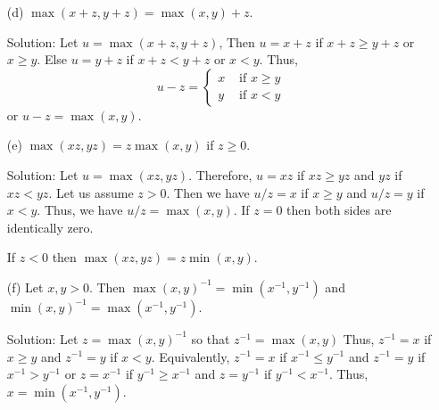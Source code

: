 \begin{enumerate}
\begin{enumerate}
\item[(d)] $\max(x + z, y + z) = \max(x, y) + z$.
\item[Solution:] Let $u = \max(x + z, y + z)$, Then $u = x + z$ if
$x + z \ge y + z$ or $x \ge y$. Else $u = y + z$ if $x + z < y + z$ or
$x < y$. Thus,
\[
u - z = \begin{cases}
x & \text{ if } x \ge y \\
y & \text{ if } x < y
\end{cases}
\]
or $u - z = \max(x, y)$.

\item[(e)] $\max(xz, yz) = z\max(x, y)$ if $z \ge 0$.
\item[Solution:] Let $u = \max(xz, yz)$. Therefore, $u = xz$ if $xz \ge
yz$ and $yz$ if $xz < yz$. Let us assume $z > 0$. Then we have $u/z = x$
if $x \ge y$ and $u/z = y$ if $x < y$. Thus, we have $u/z = \max(x, y)$.
If $z = 0$ then both sides are identically zero.

If $z < 0$ then $\max(xz, yz) = z\min(x, y)$.

\item[(f)] Let $x, y > 0$. Then $\max(x, y)^{-1} = \min(x^{-1}, y^{-1})$
and $\min(x, y)^{-1} = \max(x^{-1}, y^{-1})$.
\item[Solution:] Let $z = \max(x, y)^{-1}$ so that $z^{-1} = \max(x, y)$
Thus, $z^{-1} = x$ if $x \ge y$ and $z^{-1} = y$ if $x < y$. Equivalently,
$z^{-1} = x$ if $x^{-1} \le y^{-1}$ and $z^{-1} = y$ if $x^{-1} > y^{-1}$
or $z = x^{-1}$ if $y^{-1} \ge x^{-1}$ and $z = y^{-1}$ if $y^{-1} <
x^{-1}$. Thus, $x = \min(x^{-1}, y^{-1})$.
\end{enumerate}
\end{enumerate}
